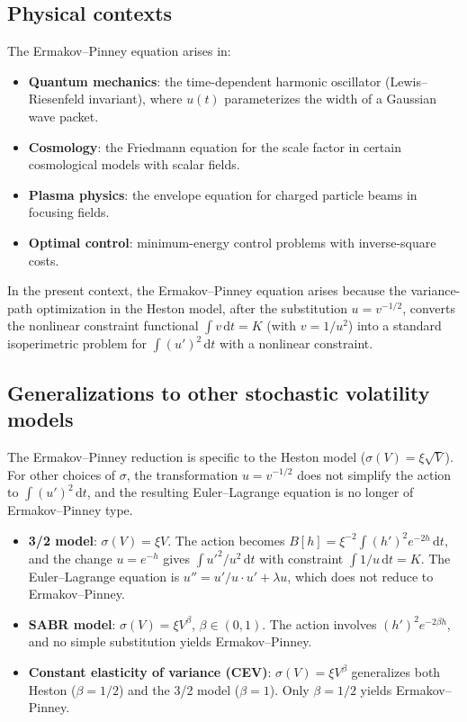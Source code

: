 \documentclass[11pt]{article}
\theoremstyle{definition}
\newcommand{\dd}{\mathrm{d}}
\begin{document}
\subsection{Physical contexts}

The Ermakov--Pinney equation arises in:
\begin{itemize}
  \item \textbf{Quantum mechanics}: the time-dependent harmonic oscillator (Lewis--Riesenfeld invariant), where $u(t)$ parameterizes the width of a Gaussian wave packet.
  \item \textbf{Cosmology}: the Friedmann equation for the scale factor in certain cosmological models with scalar fields.
  \item \textbf{Plasma physics}: the envelope equation for charged particle beams in focusing fields.
  \item \textbf{Optimal control}: minimum-energy control problems with inverse-square costs.
\end{itemize}

In the present context, the Ermakov--Pinney equation arises because the variance-path optimization in the Heston model, after the substitution $u = v^{-1/2}$, converts the nonlinear constraint functional $\int v\,\dd t = K$ (with $v = 1/u^2$) into a standard isoperimetric problem for $\int (u')^2\,\dd t$ with a nonlinear constraint.

\subsection{Generalizations to other stochastic volatility models}

The Ermakov--Pinney reduction is specific to the Heston model ($\sigma(V) = \xi\sqrt{V}$). For other choices of $\sigma$, the transformation $u = v^{-1/2}$ does not simplify the action to $\int (u')^2\,\dd t$, and the resulting Euler--Lagrange equation is no longer of Ermakov--Pinney type.

\begin{itemize}
  \item \textbf{3/2 model}: $\sigma(V) = \xi V$. The action becomes $B[h] = \xi^{-2}\int (h')^2 e^{-2h}\,\dd t$, and the change $u = e^{-h}$ gives $\int u'^2/u^2\,\dd t$ with constraint $\int 1/u\,\dd t = K$. The Euler--Lagrange equation is $u'' = u'/u \cdot u' + \lambda u$, which does not reduce to Ermakov--Pinney.

  \item \textbf{SABR model}: $\sigma(V) = \xi V^\beta$, $\beta \in (0,1)$. The action involves $(h')^2 e^{-2\beta h}$, and no simple substitution yields Ermakov--Pinney.

  \item \textbf{Constant elasticity of variance (CEV)}: $\sigma(V) = \xi V^\beta$ generalizes both Heston ($\beta = 1/2$) and the 3/2 model ($\beta = 1$). Only $\beta = 1/2$ yields Ermakov--Pinney.
\end{itemize}
\end{document}
